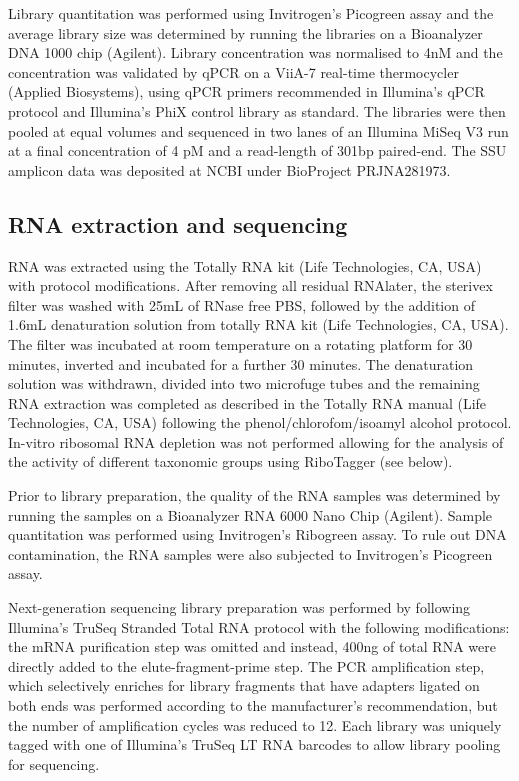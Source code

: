 Library quantitation was performed using Invitrogen's Picogreen assay and the average library size was determined by running the libraries on a Bioanalyzer DNA 1000 chip (Agilent). Library concentration was normalised to 4nM and the concentration was validated by qPCR on a ViiA-7 real-time thermocycler (Applied Biosystems), using qPCR primers recommended in Illumina's qPCR protocol and Illumina's PhiX control library as standard. The libraries were then pooled at equal volumes and sequenced in two lanes of an Illumina MiSeq V3 run at a final concentration of 4 pM and a read-length of 301bp paired-end. The SSU amplicon data was deposited at NCBI under BioProject PRJNA281973.

\subsection{RNA extraction and sequencing}

RNA was extracted using the Totally RNA kit (Life Technologies, CA, USA) with protocol modifications. After removing all residual RNAlater, the sterivex filter was washed with 25mL of RNase free PBS, followed by the addition of 1.6mL denaturation solution from totally RNA kit (Life Technologies, CA, USA). The filter was incubated at room temperature on a rotating platform for 30 minutes, inverted and incubated for a further 30 minutes. The denaturation solution was withdrawn, divided into two microfuge tubes and the remaining RNA extraction was completed as described in the Totally RNA manual (Life Technologies, CA, USA) following the phenol/chlorofom/isoamyl alcohol protocol. In-vitro ribosomal RNA depletion was not performed allowing for the analysis of the activity of different taxonomic groups using RiboTagger (see below).

Prior to library preparation, the quality of the RNA samples was determined by running the samples on a Bioanalyzer RNA 6000 Nano Chip (Agilent). Sample quantitation was performed using Invitrogen’s Ribogreen assay. To rule out DNA contamination, the RNA samples were also subjected to Invitrogen's Picogreen assay.

Next-generation sequencing library preparation was performed by following Illumina's TruSeq Stranded Total RNA protocol with the following modifications: the mRNA purification step was omitted and instead, 400ng of total RNA were directly added to the elute-fragment-prime step. The PCR amplification step, which selectively enriches for library fragments that have adapters ligated on both ends was performed according to the manufacturer's recommendation, but the number of amplification cycles was reduced to 12. Each library was uniquely tagged with one of Illumina's TruSeq LT RNA barcodes to allow library pooling for sequencing.

